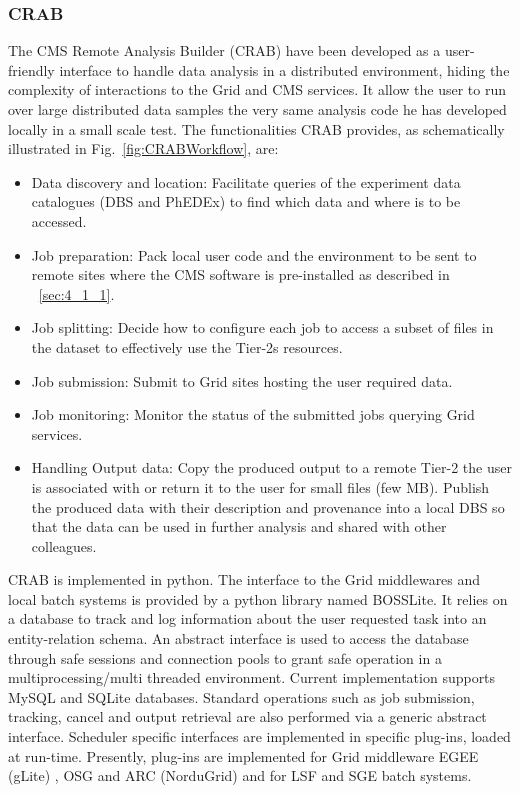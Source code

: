 \subsubsection{CRAB}
The CMS Remote Analysis Builder (CRAB)\cite{RefCRAB} have been developed as a user-friendly interface to handle data analysis in a distributed environment, hiding the complexity of interactions to the Grid and CMS services.
It allow the user to run over large distributed data samples the very same 
analysis code he has developed locally in a small scale test. 
The functionalities CRAB provides, as schematically illustrated in Fig.~\ref{fig:CRABWorkflow}, are:
\begin{itemize}
\item{Data discovery and location:}
Facilitate queries of the experiment data catalogues (DBS and PhEDEx) to find which data and where is to be accessed.
\item{Job preparation:}
Pack local user code and the environment to be sent to remote sites where the CMS software is pre-installed as described in ~\ref{sec:4_1_1}.
\item{Job splitting:}
Decide how to configure each job to access a subset of files in the dataset to effectively use the Tier-2s resources.
\item{Job submission:}
Submit to Grid sites hosting the user required data.
\item{Job monitoring:}
Monitor the status of the submitted jobs querying Grid services.
\item{Handling Output data:}
Copy the produced output to a remote Tier-2 the user is associated with or return it to the user for small files (few MB).
Publish the produced data with their description and provenance into a local DBS so that the data can be used in further analysis and shared with other colleagues.
\end{itemize} 

CRAB is implemented in python. The interface to the Grid middlewares and local batch systems is provided by a python library named BOSSLite\cite{RefBOSSLite}. It relies on a database to track and log information about the user requested task into an entity-relation schema.
An abstract interface is used to access the database through safe sessions and connection pools to grant safe operation in a multiprocessing/multi threaded environment. Current implementation supports MySQL and SQLite databases.
Standard operations such as job submission, tracking, cancel and output retrieval are also performed via a generic abstract interface. Scheduler specific interfaces are implemented in specific plug-ins, loaded at run-time. Presently, plug-ins are implemented for Grid middleware EGEE (gLite) \cite{RefgLiteWMS}, OSG \cite{RefOSG} and ARC (NorduGrid)\cite{RefARC} and for LSF and SGE batch systems.

